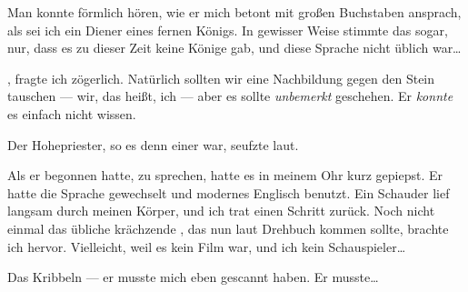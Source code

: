 Man konnte förmlich hören, wie er mich betont mit großen Buchstaben ansprach, als sei ich ein Diener eines fernen Königs. In gewisser Weise stimmte das sogar, nur, dass es zu dieser Zeit keine Könige gab, und diese Sprache nicht üblich war\dots{}


, fragte ich zögerlich. Natürlich sollten wir eine Nachbildung gegen den Stein tauschen --- wir, das heißt, ich --- aber es sollte \emph{unbemerkt} geschehen. Er \emph{konnte} es einfach nicht wissen.

Der Hohepriester, so es denn einer war, seufzte laut. 

Als er begonnen hatte, zu sprechen, hatte es in meinem Ohr kurz gepiepst. Er hatte die Sprache gewechselt und modernes Englisch benutzt. 
Ein Schauder lief langsam durch meinen Körper, und ich trat einen Schritt zurück. Noch nicht einmal das übliche krächzende , das nun laut Drehbuch kommen sollte, brachte ich hervor. Vielleicht, weil es kein Film war, und ich kein Schauspieler\dots{}

Das Kribbeln --- er musste mich eben gescannt haben. Er musste\dots{}
